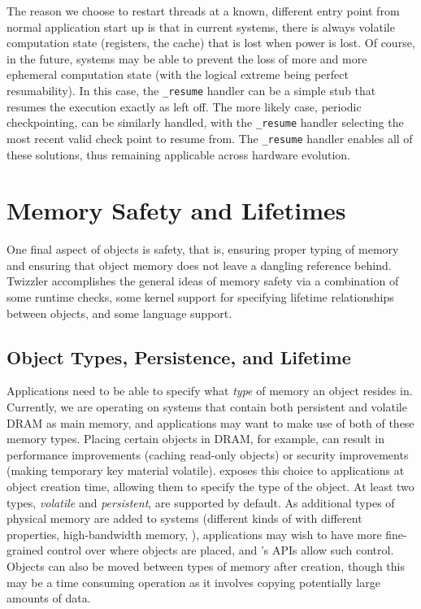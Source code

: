 The reason we choose to restart threads at a known, different entry point from normal application
start up is that in current systems, there is always volatile computation state (\eg registers, the
cache) that is lost when power is lost. Of course, in the future, systems may be able to prevent the
loss of more and more ephemeral computation state (with the logical extreme being perfect
resumability). In this case, the \texttt{\_resume} handler can be a simple stub that resumes the
execution exactly as left off. The more likely case, periodic checkpointing, can be similarly
handled, with the \texttt{\_resume} handler selecting the most recent valid check point to resume
from. The \texttt{\_resume} handler enables all of these solutions, thus remaining applicable across
hardware evolution.
\section{Memory Safety and Lifetimes}

One final aspect of objects is safety, that is, ensuring proper typing of memory and ensuring that object memory does
not leave a dangling reference behind. Twizzler accomplishes the general ideas of memory safety via a combination of
some runtime checks, some kernel support for specifying lifetime relationships between objects, and some language
support.

\subsection{Object Types, Persistence, and Lifetime}

Applications need to be able to specify what \emph{type} of memory an object resides in. Currently,
we are operating on systems that contain both persistent \NVM and volatile DRAM as main memory, and
applications may want to make use of both of these memory types. Placing certain objects in DRAM,
for example, can result in performance improvements (\eg caching read-only objects) or security
improvements (\eg making temporary key material volatile). \Twizzler exposes this choice to
applications at object creation time, allowing them to specify the type of the object. At least two
types, \emph{volatile} and \emph{persistent}, are supported by default. As additional types of physical memory
are added to systems (\eg different kinds of \NVM with different properties, high-bandwidth memory,
\etc), applications may wish to have more fine-grained control over where objects are placed, and
\Twizzler's APIs allow such control. Objects can also be moved between types of memory after
creation, though this may be a time consuming operation as it involves copying potentially large
amounts of data.

